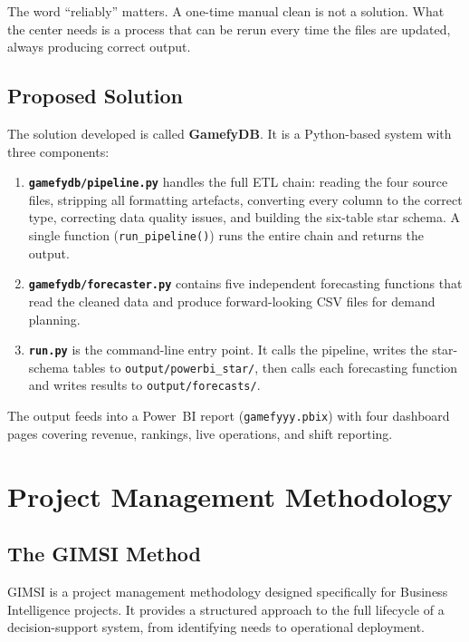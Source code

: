 \documentclass[12pt, a4paper]{report}
\begin{document}
The word ``reliably'' matters. A one-time manual clean is not a solution. What the
center needs is a process that can be rerun every time the files are updated, always
producing correct output.

\subsection{Proposed Solution}

The solution developed is called \textbf{GamefyDB}. It is a Python-based system
with three components:

\begin{enumerate}
  \item \textbf{\texttt{gamefydb/pipeline.py}} handles the full ETL chain: reading
        the four source files, stripping all formatting artefacts, converting every
        column to the correct type, correcting data quality issues, and building the
        six-table star schema. A single function (\texttt{run\_pipeline()}) runs the
        entire chain and returns the output.

  \item \textbf{\texttt{gamefydb/forecaster.py}} contains five independent
        forecasting functions that read the cleaned data and produce forward-looking
        CSV files for demand planning.

  \item \textbf{\texttt{run.py}} is the command-line entry point. It calls the
        pipeline, writes the star-schema tables to \texttt{output/powerbi\_star/},
        then calls each forecasting function and writes results to
        \texttt{output/forecasts/}.
\end{enumerate}

The output feeds into a Power~BI report (\texttt{gamefyyy.pbix}) with four
dashboard pages covering revenue, rankings, live operations, and shift reporting.

\section{Project Management Methodology}

\subsection{The GIMSI Method}

GIMSI is a project management methodology designed specifically for Business
Intelligence projects. It provides a structured approach to the full lifecycle
of a decision-support system, from identifying needs to operational deployment.
\end{document}
